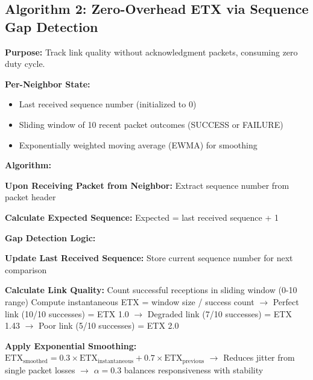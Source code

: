 \subsection{Algorithm 2: Zero-Overhead ETX via Sequence Gap Detection}

\textbf{Purpose:} Track link quality without acknowledgment packets, consuming zero duty cycle.

\textbf{Per-Neighbor State:}
\begin{itemize}
\item Last received sequence number (initialized to 0)
\item Sliding window of 10 recent packet outcomes (SUCCESS or FAILURE)
\item Exponentially weighted moving average (EWMA) for smoothing
\end{itemize}

\textbf{Algorithm:}

\begin{algorithm}[H]
\caption{Zero-Overhead ETX via Sequence Gap Detection}
\label{alg:etx}
\SetAlgoLined
\DontPrintSemicolon

\textbf{Upon Receiving Packet from Neighbor:}\;
\Indp
Extract sequence number from packet header\;

\textbf{Calculate Expected Sequence:}\;
\Indp
Expected = last received sequence + 1\;
\Indm

\textbf{Gap Detection Logic:}\;
\Indp
{}
\Indm

\textbf{Update Last Received Sequence:}\;
\Indp
Store current sequence number for next comparison\;
\Indm

\textbf{Calculate Link Quality:}\;
\Indp
Count successful receptions in sliding window (0-10 range)\;
Compute instantaneous ETX = window size / success count\;
\Indp
$\rightarrow$ Perfect link (10/10 successes) = ETX 1.0\;
$\rightarrow$ Degraded link (7/10 successes) = ETX 1.43\;
$\rightarrow$ Poor link (5/10 successes) = ETX 2.0\;
\Indm
\Indm

\textbf{Apply Exponential Smoothing:}\;
\Indp
$\text{ETX}_{\text{smoothed}} = 0.3 \times \text{ETX}_{\text{instantaneous}} + 0.7 \times \text{ETX}_{\text{previous}}$\;
$\rightarrow$ Reduces jitter from single packet losses\;
$\rightarrow$ $\alpha = 0.3$ balances responsiveness with stability\;
\Indm
\Indm
\end{algorithm}

